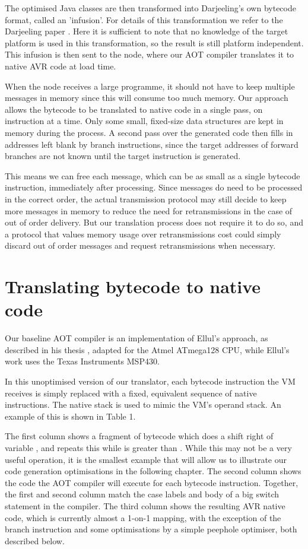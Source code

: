 The optimised Java classes are then transformed into Darjeeling's own bytecode format, called an 'infusion'. For details of this transformation we refer to the Darjeeling paper \cite{Brouwers:2009cj}. Here it is sufficient to note that no knowledge of the target platform is used in this transformation, so the result is still platform independent. This infusion is then sent to the node, where our AOT compiler translates it to native AVR code at load time.

When the node receives a large programme, it should not have to keep multiple messages in memory since this will consume too much memory. Our approach allows the bytecode to be translated to native code in a single pass, on instruction at a time. Only some small, fixed-size data structures are kept in memory during the process. A second pass over the generated code then fills in addresses left blank by branch instructions, since the target addresses of forward branches are not known until the target instruction is generated.

This means we can free each message, which can be as small as a single bytecode instruction, immediately after processing. Since messages do need to be processed in the correct order, the actual transmission protocol may still decide to keep more messages in memory to reduce the need for retransmissions in the case of out of order delivery. But our translation process does not require it to do so, and a protocol that values memory usage over retransmissions cost could simply discard out of order messages and request retransmissions when necessary.


\section{Translating bytecode to native code}
\label{sec-basic-translation}
Our baseline AOT compiler is an implementation of Ellul's approach, as described in his thesis \cite{Ellul:2012thesis}, adapted for the Atmel ATmega128 CPU, while Ellul's work uses the Texas Instruments MSP430. 

In this unoptimised version of our translator, each bytecode instruction the VM receives is simply replaced with a fixed, equivalent sequence of native instructions. The native stack is used to mimic the VM's operand stack. An example of this is shown in Table 1.

The first column shows a fragment of bytecode which does a shift right of variable , and repeats this while  is greater than . While this may not be a very useful operation, it is the smallest example that will allow us to illustrate our code generation optimisations in the following chapter. The second column shows the code the AOT compiler will execute for each bytecode instruction. Together, the first and second column match the case labels and body of a big switch statement in the compiler. The third column shows the resulting AVR native code, which is currently almost a 1-on-1 mapping, with the exception of the branch instruction and some optimisations by a simple peephole optimiser, both described below.

